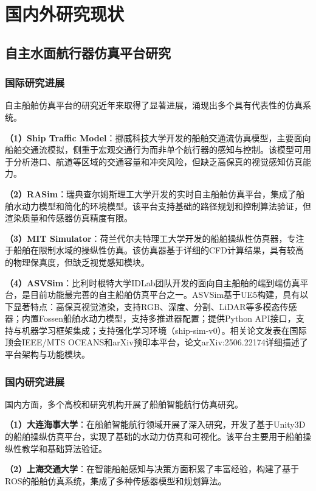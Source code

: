 \documentclass[12pt,a4paper]{ctexbook}
\begin{document}
\section{国内外研究现状}

\subsection{自主水面航行器仿真平台研究}

\subsubsection{国际研究进展}

自主船舶仿真平台的研究近年来取得了显著进展，涌现出多个具有代表性的仿真系统。

\textbf{（1）Ship Traffic Model}：挪威科技大学开发的船舶交通流仿真模型，主要面向船舶交通流模拟，侧重于宏观交通行为而非单个航行器的感知与控制。该模型可用于分析港口、航道等区域的交通容量和冲突风险，但缺乏高保真的视觉感知仿真能力。

\textbf{（2）RASim}：瑞典查尔姆斯理工大学开发的实时自主船舶仿真平台，集成了船舶水动力模型和简化的环境模型。该平台支持基础的路径规划和控制算法验证，但渲染质量和传感器仿真精度有限。

\textbf{（3）MIT Simulator}：荷兰代尔夫特理工大学开发的船舶操纵性仿真器，专注于船舶在限制水域的操纵性仿真。该仿真器基于详细的CFD计算结果，具有较高的物理保真度，但缺乏视觉感知模块。

\textbf{（4）ASVSim}：比利时根特大学IDLab团队开发的面向自主船舶的端到端仿真平台，是目前功能最完善的自主船舶仿真平台之一。ASVSim基于UE5构建，具有以下显著特点：高保真视觉渲染，支持RGB、深度、分割、LiDAR等多模态传感器；内置Fossen船舶水动力模型，支持多推进器配置；提供Python API接口，支持与机器学习框架集成；支持强化学习环境（ship-sim-v0）。相关论文发表在国际顶会IEEE/MTS OCEANS和arXiv预印本平台，论文arXiv:2506.22174详细描述了平台架构与功能模块。

\subsubsection{国内研究进展}

国内方面，多个高校和研究机构开展了船舶智能航行仿真研究。

\textbf{（1）大连海事大学}：在船舶智能航行领域开展了深入研究，开发了基于Unity3D的船舶操纵仿真平台，实现了基础的水动力仿真和可视化。该平台主要用于船舶操纵性教学和基础算法验证。

\textbf{（2）上海交通大学}：在智能船舶感知与决策方面积累了丰富经验，构建了基于ROS的船舶仿真系统，集成了多种传感器模型和规划算法。
\end{document}
